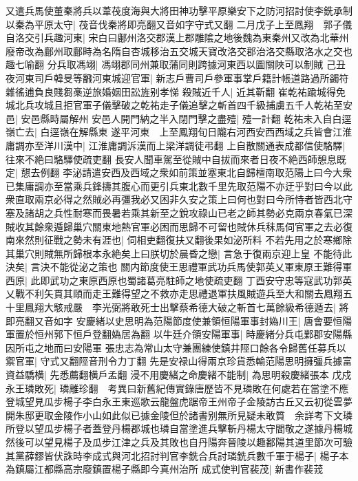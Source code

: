 又遣兵馬使董秦將兵以葦茷度海與大將田神功擊平原樂安下之防河招討使李銑承制以秦為平原太守|{
	茷音伐秦將即亮翻又音如字守式又翻}
二月戊子上至鳳翔　郭子儀自洛交引兵趣河東|{
	宋白曰鄜州洛交郡漢上郡雕隂之地後魏為東秦州又改為北華州廢帝改為鄜州取鄜畤為名隋自杏城移治五交城天寶改洛交郡治洛交縣取洛水之交也趣七喻翻}
分兵取馮翊|{
	馮翊郡同州兼取蒲同則跨據河東西以圖關陜可以制賊}
己丑夜河東司戶韓旻等飜河東城迎官軍|{
	新志戶曹司戶參軍事掌戶籍計帳道路過所蠲符雜徭逋負良賤芻槀逆旅婚姻田訟旌别孝悌}
殺賊近千人|{
	近其靳翻}
崔乾祐踰城得免城北兵攻城且拒官軍子儀擊破之乾祐走子儀追擊之斬首四千級捕虜五千人乾祐至安邑|{
	安邑縣時屬解州}
安邑人開門納之半入閉門擊之盡殪|{
	殪一計翻}
乾祐未入自白逕嶺亡去|{
	白逕嶺在解縣東}
遂平河東　上至鳳翔旬日隴右河西安西西域之兵皆會江淮庸調亦至洋川漢中|{
	江淮庸調泝漢而上梁洋調徒弔翻}
上自散關通表成都信使駱驛|{
	往來不絶曰駱驛使疏吏翻}
長安人聞車駕至從賊中自拔而來者日夜不絶西師憩息既定|{
	憇去例翻}
李泌請遣安西及西域之衆如前策並塞東北自歸檀南取范陽上曰今大衆已集庸調亦至當乘兵鋒擣其腹心而更引兵東北數千里先取范陽不亦迂乎對曰今以此衆直取兩京必得之然賊必再彊我必又困非久安之策上曰何也對曰今所恃者皆西北守塞及諸胡之兵性耐寒而畏暑若乘其新至之銳攻祿山已老之師其勢必克兩京春氣已深賊收其餘衆遁歸巢穴關東地熱官軍必困而思歸不可留也賊休兵秣馬伺官軍之去必復南來然則征戰之勢未有涯也|{
	伺相吏翻復扶又翻後果如泌所料}
不若先用之於寒鄉除其巢穴則賊無所歸根本永絶矣上曰朕切於晨昏之戀|{
	言急于復兩京迎上皇}
不能待此決矣|{
	言決不能從泌之策也}
關内節度使王思禮軍武功兵馬使郭英乂軍東原王難得軍西原|{
	此即武功之東原西原也蜀諸葛亮駐師之地使疏吏翻}
丁酉安守忠等寇武功郭英乂戰不利矢貫其頤而走王難得望之不救亦走思禮退軍扶風賊遊兵至大和關去鳳翔五十里鳳翔大駭戒嚴　李光弼將敢死士出擊蔡希德大破之斬首七萬餘級希德遁去|{
	將即亮翻又音如字}
安慶緒以史思明為范陽節度使兼領恒陽軍事封媯川王|{
	唐會要恒陽軍置於恒州郭下恒戶登翻媯居為翻}
以牛廷介領安陽軍事|{
	時慶緒分兵屯鄴郡安陽縣因所屯之地而曰安陽軍}
張忠志為常山太守兼團練使鎮井陘口餘各令歸舊任募兵以禦官軍|{
	守式又翻陘音刑令力丁翻}
先是安禄山得兩京珍貨悉輸范陽思明擁彊兵據富資益驕横|{
	先悉薦翻横戶孟翻}
浸不用慶緒之命慶緒不能制|{
	為思明殺慶緒張本}
戊戍永王璘敗死|{
	璘離珍翻　考異曰新舊紀傳實錄唐歷皆不見璘敗在何處若在當塗不應登城望見瓜步楊子李白永王東巡歌云龍盤虎踞帝王州帝子金陵訪古丘又云初從雲夢開朱邸更取金陵作小山如此似已據金陵但於諸書别無所見疑未敢質　余詳考下文璘所登以望瓜步楊子者蓋登丹楊郡城也璘自當塗進兵擊斬丹楊太守閻敬之遂據丹楊城然後可以望見楊子及瓜步江津之兵及其敗也自丹陽奔晉陵以趣鄱陽其道里節次可驗}
其黨薛鏐皆伏誅時李成式與河北招討判官李銑合兵討璘銑兵數千軍于楊子|{
	楊子本為鎮屬江都縣高宗廢鎮置楊子縣即今真州治所}
成式使判官裴茂|{
	新書作裴茙}
